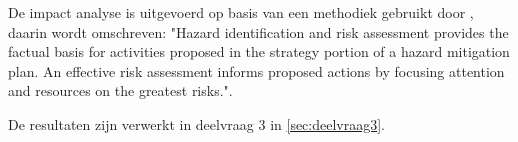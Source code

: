 
De impact analyse is uitgevoerd op basis van een methodiek gebruikt door \textcite{fema}, daarin wordt omschreven: "Hazard identification and risk assessment provides the factual basis for activities proposed in the strategy portion of a hazard mitigation plan. An effective risk assessment informs proposed actions by focusing attention and resources on the greatest risks.". 

De resultaten zijn verwerkt in deelvraag 3 in \ref{sec:deelvraag3}.

